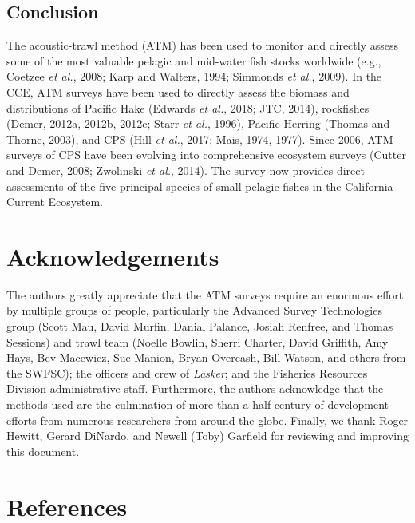 \documentclass[]{article}
\begin{document}
\hypertarget{discussion-conclusion}{%
\subsection{Conclusion}\label{discussion-conclusion}}

The acoustic-trawl method (ATM) has been used to monitor and directly assess some of the most valuable pelagic and mid-water fish stocks worldwide (e.g., Coetzee \emph{et al.}, 2008; Karp and Walters, 1994; Simmonds \emph{et al.}, 2009). In the CCE, ATM surveys have been used to directly assess the biomass and distributions of Pacific Hake (Edwards \emph{et al.}, 2018; JTC, 2014), rockfishes (Demer, 2012a, 2012b, 2012c; Starr \emph{et al.}, 1996), Pacific Herring (Thomas and Thorne, 2003), and CPS (Hill \emph{et al.}, 2017; Mais, 1974, 1977). Since 2006, ATM surveys of CPS have been evolving into comprehensive ecosystem surveys (Cutter and Demer, 2008; Zwolinski \emph{et al.}, 2014). The survey now provides direct assessments of the five principal species of small pelagic fishes in the California Current Ecosystem.

\hypertarget{acknowledgements}{%
\section*{Acknowledgements}\label{acknowledgements}}

The authors greatly appreciate that the ATM surveys require an enormous effort by multiple groups of people, particularly the Advanced Survey Technologies group (Scott Mau, David Murfin, Danial Palance, Josiah Renfree, and Thomas Sessions) and trawl team (Noelle Bowlin, Sherri Charter, David Griffith, Amy Hays, Bev Macewicz, Sue Manion, Bryan Overcash, Bill Watson, and others from the SWFSC); the officers and crew of \emph{Lasker}; and the Fisheries Resources Division administrative staff. Furthermore, the authors acknowledge that the methods used are the culmination of more than a half century of development efforts from numerous researchers from around the globe. Finally, we thank Roger Hewitt, Gerard DiNardo, and Newell (Toby) Garfield for reviewing and improving this document.

\hypertarget{references}{%
\section*{References}\label{references}}
\end{document}
